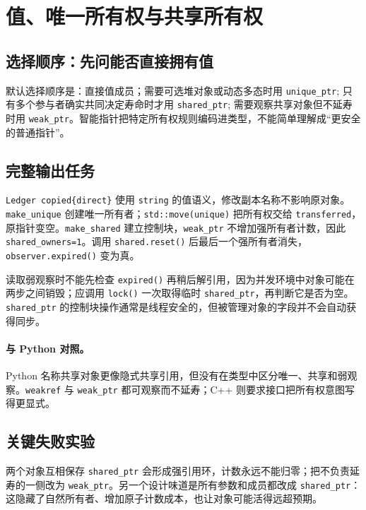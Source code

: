 \section{值、唯一所有权与共享所有权}

\subsection{选择顺序：先问能否直接拥有值}

默认选择顺序是：直接值成员；需要可选堆对象或动态多态时用 \texttt{unique\_ptr}; 只有多个参与者确实共同决定寿命时才用 \texttt{shared\_ptr}; 需要观察共享对象但不延寿时用 \texttt{weak\_ptr}。智能指针把特定所有权规则编码进类型，不能简单理解成“更安全的普通指针”。

\subsection{完整输出任务}



\texttt{Ledger copied\{direct\}} 使用 \texttt{string} 的值语义，修改副本名称不影响原对象。\texttt{make\_unique} 创建唯一所有者；\texttt{std::move(unique)} 把所有权交给 \texttt{transferred}，原指针变空。\texttt{make\_shared} 建立控制块，\texttt{weak\_ptr} 不增加强所有者计数，因此 \texttt{shared\_owners=1}。调用 \texttt{shared.reset()} 后最后一个强所有者消失，\texttt{observer.expired()} 变为真。

读取弱观察时不能先检查 \texttt{expired()} 再稍后解引用，因为并发环境中对象可能在两步之间销毁；应调用 \texttt{lock()} 一次取得临时 \texttt{shared\_ptr}，再判断它是否为空。\texttt{shared\_ptr} 的控制块操作通常是线程安全的，但被管理对象的字段并不会自动获得同步。

\paragraph{与 Python 对照。}
Python 名称共享对象更像隐式共享引用，但没有在类型中区分唯一、共享和弱观察。\texttt{weakref} 与 \texttt{weak\_ptr} 都可观察而不延寿；C++ 则要求接口把所有权意图写得更显式。

\subsection{关键失败实验}

两个对象互相保存 \texttt{shared\_ptr} 会形成强引用环，计数永远不能归零；把不负责延寿的一侧改为 \texttt{weak\_ptr}。另一个设计味道是所有参数和成员都改成 \texttt{shared\_ptr}：这隐藏了自然所有者、增加原子计数成本，也让对象可能活得远超预期。

